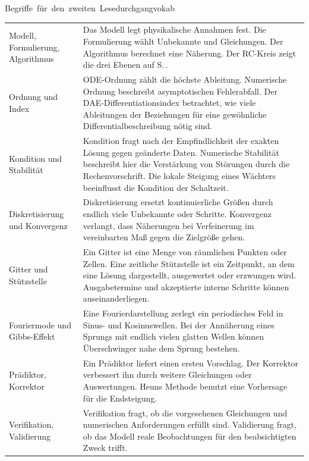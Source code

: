 \unit{Begriffe für den zweiten Lesedurchgang}{vokab}
{\tblstart\begin{tabularx}{\linewidth}{@{}P{35mm}Y@{}}\toprule
{}&\\\midrule
Modell, Formulierung, Algorithmus&Das Modell legt physikalische Annahmen fest. Die Formulierung wählt Unbekannte und Gleichungen. Der Algorithmus berechnet eine Näherung. Der RC-Kreis zeigt die drei Ebenen auf S.\,.\\
Ordnung und Index&ODE-Ordnung zählt die höchste Ableitung. Numerische Ordnung beschreibt asymptotischen Fehlerabfall. Der DAE-Differentiationsindex betrachtet, wie viele Ableitungen der Beziehungen für eine gewöhnliche Differentialbeschreibung nötig sind.\\
Kondition und Stabilität&Kondition fragt nach der Empfindlichkeit der exakten Lösung gegen geänderte Daten. Numerische Stabilität beschreibt hier die Verstärkung von Störungen durch die Rechenvorschrift. Die lokale Steigung eines Wächters beeinflusst die Kondition der Schaltzeit.\\
Diskretisierung und Konvergenz&Diskretisierung ersetzt kontinuierliche Größen durch endlich viele Unbekannte oder Schritte. Konvergenz verlangt, dass Näherungen bei Verfeinerung im vereinbarten Maß gegen die Zielgröße gehen.\\
Gitter und Stützstelle&Ein Gitter ist eine Menge von räumlichen Punkten oder Zellen. Eine zeitliche Stützstelle ist ein Zeitpunkt, an dem eine Lösung dargestellt, ausgewertet oder erzwungen wird. Ausgabetermine und akzeptierte interne Schritte können auseinanderliegen.\\
Fouriermode und Gibbs-Effekt&Eine Fourierdarstellung zerlegt ein periodisches Feld in Sinus- und Kosinuswellen. Bei der Annäherung eines Sprungs mit endlich vielen glatten Wellen können Überschwinger nahe dem Sprung bestehen.\\
Prädiktor, Korrektor&Ein Prädiktor liefert einen ersten Vorschlag. Der Korrektor verbessert ihn durch weitere Gleichungen oder Auswertungen. Heuns Methode benutzt eine Vorhersage für die Endsteigung.\\
Verifikation, Validierung&Verifikation fragt, ob die vorgesehenen Gleichungen und numerischen Anforderungen erfüllt sind. Validierung fragt, ob das Modell reale Beobachtungen für den beabsichtigten Zweck trifft.\\\bottomrule\end{tabularx}\par}

